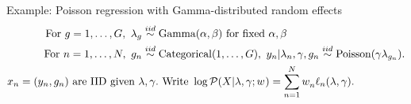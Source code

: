 
\begin{frame}{Example: Poisson regression with Gamma-distributed random effects}
    \begin{align*}
    \textrm{For }g=1,\ldots,G,\textrm{ }
        \lambda_g \overset{iid}{\sim}{}& \mathrm{Gamma}(\alpha, \beta) \textrm{ for fixed }\alpha,\beta\\
    \textrm{For }n = 1,\ldots,N,\textrm{ }
        g_n \overset{iid}{\sim}{}& \mathrm{Categorical}(1,\ldots,G),\textrm{ }
        y_n | \lambda_n, \gamma, g_n \overset{iid}{\sim}{}
            \mathrm{Poisson}(\gamma \lambda_{g_n}).\\
    x_n ={} (y_n, g_n)
    \textrm{ are IID given } \lambda, \gamma. &
    \textrm{   Write }\log \mathcal{P}(X \vert \lambda, \gamma; w^{}) =
       \sum_{n=1}^N w^{}_n \ell_n(\lambda, \gamma).
    \end{align*}
    
    \pause
    
    \HighDimAccuracyGraph{}
    
\end{frame}
        



\def\gdist{\mathbb{G}}
\def\fndist{\mathbb{F}_N}
\def\ftdist{\mathbb{F}_N^{\t}}
\def\fwdist{\mathbb{F}_{N}^{w}}
\def\T{T}   %
\def\Tlin{T_{\mathrm{lin}}} %
\def\t{t}   %
\def\g{g}   %
\def\xn{\x_{0}}   %
\def\prior{\pi}
\def\ttil{\tilde{\t}}   %










